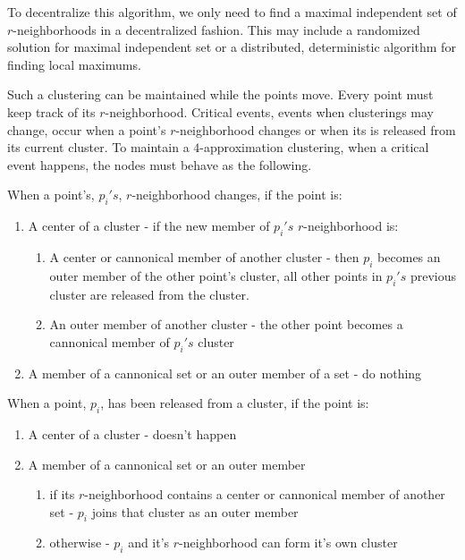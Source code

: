 To decentralize this algorithm, we only need to find a maximal independent set of $r$-neighborhoods in a decentralized fashion.  This may include a randomized solution for maximal independent set or a distributed, deterministic algorithm for finding local maximums.

Such a clustering can be maintained while the points move.  Every point must keep track of its $r$-neighborhood.  Critical events, events when clusterings may change, occur when a point's $r$-neighborhood changes or when its is released from its current cluster.  To maintain a $4$-approximation clustering, when a critical event happens, the nodes must behave as the following.

When a point's, $p_i's$, $r$-neighborhood changes, if the point is:
\begin{enumerate}
\item A center of a cluster - if the new member of $p_i's$ $r$-neighborhood is:
\begin{enumerate}
\item A center or cannonical member of another cluster - then $p_i$ becomes an outer member of the other point's cluster, all other points in $p_i's$ previous cluster are released from the cluster.
\item An outer member of another cluster - the other point becomes a cannonical member of $p_i's$ cluster
\end{enumerate}
\item A member of a cannonical set or an outer member of a set - do nothing
\end{enumerate}

When a point, $p_i$, has been released from a cluster, if the point is:
\begin{enumerate}
\item A center of a cluster - doesn't happen
\item A member of a cannonical set or an outer member
\begin{enumerate}
\item if its $r$-neighborhood contains a center or cannonical member of another set - $p_i$ joins that cluster as an outer member
\item otherwise - $p_i$ and it's $r$-neighborhood can form it's own cluster
\end{enumerate}
\end{enumerate}